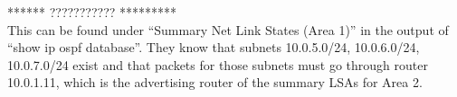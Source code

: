 ****** ??????????? ********* \\
This can be found under ``Summary Net Link States (Area 1)'' in the output of ``show ip ospf database''.
They know that subnets 10.0.5.0/24, 10.0.6.0/24, 10.0.7.0/24 exist and that packets for those subnets must go through router 10.0.1.11, which is the advertising router of the summary LSAs for Area 2.

